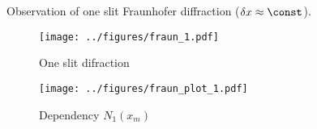 Observation of one slit Fraunhofer diffraction ($\delta x \approx \const$).
\begin{figure}[h]
    \begin{minipage}{0.48\textwidth}
            \hspace{-0.5cm}
            \texttt{[image: ../figures/fraun\_1.pdf]}
            \vspace{-9mm}
            \caption{One slit difraction}
    \end{minipage}
    \hfill
    \begin{minipage}{0.48\textwidth}
            \texttt{[image: ../figures/fraun\_plot\_1.pdf]}
            \vspace{1mm}
            \caption{Dependency $N_1(x_m)$}
    \end{minipage}
\end{figure}

